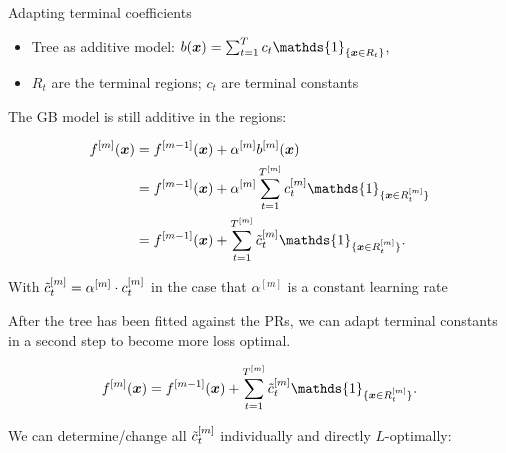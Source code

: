 \begin{vbframe}{Adapting terminal coefficients}

\begin{itemize}
\item Tree as additive model: $ b(\xv) = \sum_{t=1}^{T} c_t \mathds{1}_{\{\xv \in R_t\}} $,
\item $R_t$ are the terminal regions; $c_t$ are terminal constants 
\end{itemize}


\vspace*{0.2cm}

The GB model is still additive in the regions:

\begin{align*}
  \fm(\xv) &= \fmd(\xv) +  \alpha^{[m]} \bl(\xv) \\
         &= \fmd(\xv) +  \alpha^{[m]} \sum_{t=1}^{\Tm} \ctm \mathds{1}_{\{\xv \in \Rtm\}}\\
         &= \fmd(\xv) +  \sum_{t=1}^{\Tm} \ctmt \mathds{1}_{\{\xv \in \Rtm\}}.
\end{align*}

With $\tilde{c}_t^{[m]} = \alpha^{[m]} \cdot c_t^{[m]}$ in the case that $\alpha^{[m]}$ is a constant learning rate


\framebreak
\begin{small}
After the tree has been fitted against the PRs, we can adapt terminal constants in a second step to become more loss optimal.

$$
\fm(\xv) = \fmd(\xv) +  \sum_{t=1}^{\Tm} \ctmt \mathds{1}_{\{\xv \in \Rtm\}}. 
$$

We can determine/change all $\tilde{c}_t^{[m]}$ individually and directly $L$-optimally:



\end{small}
\end{vbframe}
